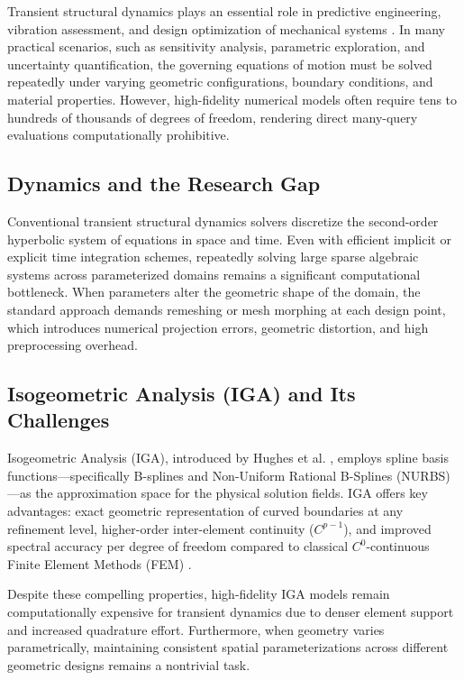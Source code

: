 Transient structural dynamics plays an essential role in predictive engineering, vibration assessment, and design optimization of mechanical systems \cite{hughes2005, Benner2015}. In many practical scenarios, such as sensitivity analysis, parametric exploration, and uncertainty quantification, the governing equations of motion must be solved repeatedly under varying geometric configurations, boundary conditions, and material properties. However, high-fidelity numerical models often require tens to hundreds of thousands of degrees of freedom, rendering direct many-query evaluations computationally prohibitive.

\subsection{Dynamics and the Research Gap}
Conventional transient structural dynamics solvers discretize the second-order hyperbolic system of equations in space and time. Even with efficient implicit or explicit time integration schemes, repeatedly solving large sparse algebraic systems across parameterized domains remains a significant computational bottleneck. When parameters alter the geometric shape of the domain, the standard approach demands remeshing or mesh morphing at each design point, which introduces numerical projection errors, geometric distortion, and high preprocessing overhead.

\subsection{Isogeometric Analysis (IGA) and Its Challenges}
Isogeometric Analysis (IGA), introduced by Hughes et al. \cite{hughes2005}, employs spline basis functions—specifically B-splines and Non-Uniform Rational B-Splines (NURBS)—as the approximation space for the physical solution fields. IGA offers key advantages: exact geometric representation of curved boundaries at any refinement level, higher-order inter-element continuity ($C^{p-1}$), and improved spectral accuracy per degree of freedom compared to classical $C^0$-continuous Finite Element Methods (FEM) \cite{cottrell2009}. 

Despite these compelling properties, high-fidelity IGA models remain computationally expensive for transient dynamics due to denser element support and increased quadrature effort. Furthermore, when geometry varies parametrically, maintaining consistent spatial parameterizations across different geometric designs remains a nontrivial task.

